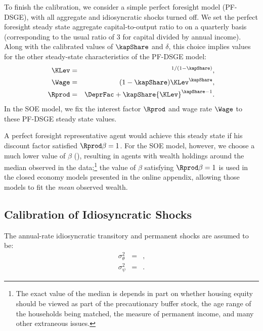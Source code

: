 To finish the calibration, we consider a simple perfect foresight model (PF-DSGE), with all aggregate and idiosyncratic shocks turned off.  We set the perfect foresight steady state aggregate capital-to-output ratio to  on a quarterly basis (corresponding to the usual ratio of 3 for capital divided by annual income).  Along with the calibrated values of $\kapShare$ and $\delta$, this choice implies values for the other steady-state characteristics of the PF-DSGE model:
\begin{eqnarray*}
	{\KLev} & = &  ^{1/(1-\kapShare)},
	\\   {\Wage} & = & (1-\kapShare) {\KLev}^{\kapShare},
	\\   {\Rprod} & = & \DeprFac+\kapShare {\KLev}^{\kapShare-1}
	.
\end{eqnarray*}
In the SOE model, we fix the interest factor $\Rprod$ and wage rate $\Wage$ to these PF-DSGE steady state values.

A perfect foresight representative agent would achieve this steady state if his discount factor satisfied ${\Rprod} \beta = 1$.  For the SOE model, however, we choose a much lower value of $\beta$ ($  $), resulting in agents with wealth holdings around the median observed in the data;\footnote{The exact value of the median is depends in part on whether housing equity should be viewed as part of the precautionary buffer stock, the age range of the households being matched, the measure of permanent income, and many other extraneous issues.} the value of $\beta$ satisfying ${\Rprod} \beta = 1$ is used in the closed economy models presented in the online appendix, allowing those models to fit the \textit{mean}  observed wealth.

\subsection{Calibration of Idiosyncratic Shocks}

The annual-rate idiosyncratic transitory and permanent shocks are assumed to be:
\begin{eqnarray*}
	\sigma_{\theta}^{2} & = &  ,
	\\ \sigma_{\psi}^{2}             & = & 
	.
\end{eqnarray*}

